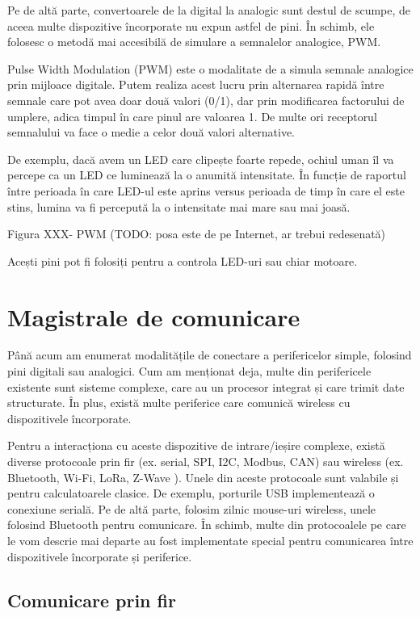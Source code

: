 Pe de altă parte, convertoarele de la digital la analogic sunt destul de scumpe,
de aceea multe dispozitive încorporate nu expun astfel de pini. În schimb, ele
folosesc o metodă mai accesibilă de simulare a semnalelor analogice, PWM.

Pulse Width Modulation (PWM) este o modalitate de a simula semnale analogice
prin mijloace digitale. Putem realiza acest lucru prin alternarea rapidă între
semnale care pot avea doar două valori (0/1), dar prin modificarea factorului de
umplere, adica timpul în care pinul are valoarea 1. De multe ori receptorul
semnalului va face o medie a celor două valori alternative.

De exemplu, dacă avem un LED care clipește foarte repede, ochiul uman îl va
percepe ca un LED ce luminează la o anumită intensitate. În funcție de raportul
între perioada în care LED-ul este aprins versus perioada de timp în care el
este stins, lumina va fi percepută la o intensitate mai mare sau mai joasă.

Figura XXX- PWM (TODO: posa este de pe Internet, ar trebui redesenată)

Acești pini pot fi folosiți pentru a controla LED-uri sau chiar motoare.

\section{Magistrale de comunicare}
\label{sec:embed-bus}

Până acum am enumerat modalitățile de conectare a perifericelor simple, folosind
pini digitali sau analogici. Cum am menționat deja, multe din perifericele
existente sunt sisteme complexe, care au un procesor integrat și care trimit
date structurate. În plus, există multe periferice care comunică wireless cu
dispozitivele încorporate.

Pentru a interacționa cu aceste dispozitive de intrare/ieșire complexe, există
diverse protocoale prin fir (ex. serial, SPI, I2C, Modbus, CAN) sau wireless
(ex. Bluetooth, Wi-Fi, LoRa, Z-Wave ). Unele din aceste protocoale sunt valabile
și pentru calculatoarele clasice. De exemplu, porturile USB implementează o
conexiune serială. Pe de altă parte, folosim zilnic mouse-uri wireless, unele
folosind Bluetooth pentru comunicare. În schimb, multe din protocoalele pe care
le vom descrie mai departe au fost implementate special pentru comunicarea între
dispozitivele încorporate și periferice.

\subsection{Comunicare prin fir}
\label{sec:embed-bus-wire}

